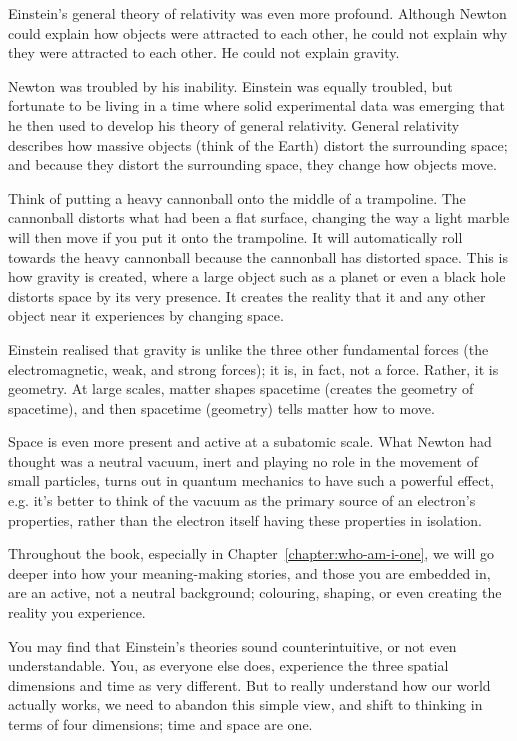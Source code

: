 Einstein's general theory of relativity was even more profound. Although Newton could explain how objects were attracted to each other, he could not explain why they were attracted to each other. He could not explain gravity.


Newton was troubled by his inability. Einstein  was equally troubled, but fortunate to be living in a time where solid experimental data was emerging that he then used to develop his theory of general relativity. General relativity describes how massive objects (think of the Earth) distort the surrounding space; and because they distort the surrounding space, they change how objects move.


Think of putting a heavy cannonball onto the middle of a trampoline. The cannonball distorts what had been a flat surface, changing the way a light marble will then move if you put it onto the trampoline. It will automatically roll towards the heavy cannonball because the cannonball has distorted space. This is how gravity is created, where a large object such as a planet or even a black hole distorts space by its very presence. It creates the reality that it and any other object near it experiences by changing space.


Einstein realised that gravity is unlike the three other fundamental forces (the electromagnetic, weak, and strong forces); it is, in fact, not a force. Rather, it is geometry. At large scales, matter shapes spacetime (creates the geometry of spacetime), and then spacetime (geometry) tells matter how to move.


Space is even more present and active at a subatomic scale. What Newton had thought was a neutral vacuum, inert and playing no role in the movement of small particles, turns out in quantum mechanics to have such a powerful effect, e.g. it’s better to think of the vacuum as the primary source of an electron's properties, rather than the electron itself having these properties in isolation. 


Throughout the book, especially in Chapter~\ref{chapter:who-am-i-one}, we will go deeper into how your meaning\hyp{}making stories, and those you are embedded in, are an active, not a neutral background; colouring, shaping, or even creating the reality you experience.


You may find that Einstein's theories sound counterintuitive, or not even understandable. You, as everyone else does, experience the three spatial dimensions and time as very different. But to really understand how our world actually works, we need to abandon this simple view, and shift to thinking in terms of four dimensions; time and space are one.


